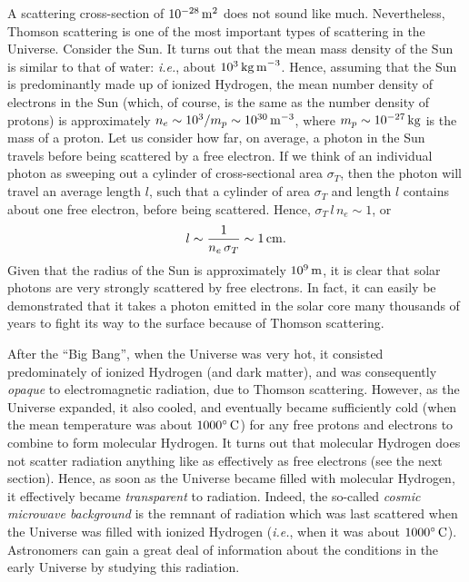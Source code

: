 A scattering cross-section of $10^{-28}\,{\rm m^2}$ does not sound like much. Nevertheless, Thomson scattering is one of the most important types
of scattering in the Universe. Consider the Sun. It turns out that the
mean mass density of the Sun is similar to that of water: {\em i.e.}, 
about $10^3\,{\rm kg\,m}^{-3}$. Hence, assuming that
the Sun is predominantly made up   of ionized Hydrogen, the mean number density of electrons in the Sun (which, of course, is the same as
the number density of protons) is approximately $n_e \sim 10^3/m_p\sim 10^{30}\,{\rm m}^{-3}$, where
$m_p\sim 10^{-27}\,{\rm kg}$ is the mass of a proton. 
Let us consider how far, on average, a photon in the Sun travels before
being scattered by a free electron. If we think of an individual photon
as sweeping out a cylinder of cross-sectional area $\sigma_T$, then the photon will travel an average length $l$, such that a cylinder of area $\sigma_T$ and length $l$ contains about one free electron, before
being scattered. Hence, $\sigma_T\,l \,n_e\sim 1$, or
\begin{equation}
l \sim \frac{1}{n_e\,\sigma_T}\sim 1\,{\rm cm}.
\end{equation}
Given that the radius of the Sun is approximately $10^9\,{\rm m}$, it is
clear that solar photons are very strongly scattered by free electrons.
In fact, it can easily be demonstrated that it takes a photon emitted in the solar
core many thousands of years to fight its way to the surface
because of Thomson scattering.

After the ``Big Bang'', when the Universe was very hot, it consisted
predominately of ionized Hydrogen (and dark matter), and was consequently
{\em opaque}\/ to electromagnetic radiation, due to Thomson scattering. However,
as the Universe expanded, it also cooled, and eventually became sufficiently
cold (when the mean temperature was about $1000^\circ\,{\rm C}$) for any free protons and electrons to combine to form molecular
Hydrogen. It turns out that molecular Hydrogen does not scatter radiation
anything like as effectively as free electrons (see the next section). Hence, as soon as the
Universe became filled with molecular Hydrogen, it effectively became 
{\em transparent}\/ to radiation. Indeed, the so-called  {\em cosmic microwave background}\/  is the remnant of radiation which was last scattered
when the Universe was filled with ionized Hydrogen ({\em i.e.}, when it was about 
$1000^\circ\,{\rm C}$). Astronomers can gain a great deal of information
about the conditions in the early Universe by studying this radiation.

